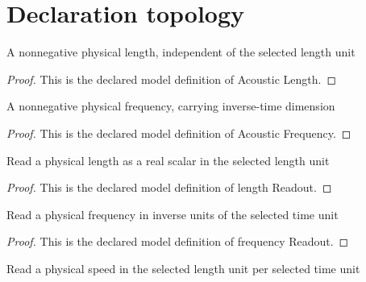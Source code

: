 \section{Declaration topology}
\begin{definition}
  \label{def:physics:phyx-mini-0328:phyxminiproblems-problemphyxmini0328-acousticlength}
  A nonnegative physical length, independent of the selected length unit
\end{definition}
\begin{proof}
  This is the declared model definition of Acoustic Length.
\end{proof}
\begin{definition}
  \label{def:physics:phyx-mini-0328:phyxminiproblems-problemphyxmini0328-acousticfrequency}
  A nonnegative physical frequency, carrying inverse-time dimension
\end{definition}
\begin{proof}
  This is the declared model definition of Acoustic Frequency.
\end{proof}
\begin{definition}
  \label{def:physics:phyx-mini-0328:phyxminiproblems-problemphyxmini0328-lengthreadout}
  Read a physical length as a real scalar in the selected length unit
\end{definition}
\begin{proof}
  This is the declared model definition of length Readout.
\end{proof}
\begin{definition}
  \label{def:physics:phyx-mini-0328:phyxminiproblems-problemphyxmini0328-frequencyreadout}
  Read a physical frequency in inverse units of the selected time unit
\end{definition}
\begin{proof}
  This is the declared model definition of frequency Readout.
\end{proof}
\begin{definition}
  \label{def:physics:phyx-mini-0328:phyxminiproblems-problemphyxmini0328-speedreadout}
  Read a physical speed in the selected length unit per selected time unit
\end{definition}
